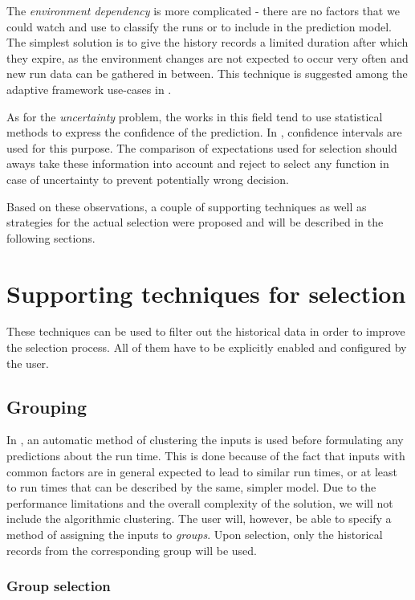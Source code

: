 The \textit{environment dependency} is more complicated - there are no factors that we could watch and use to classify the runs or to include in the prediction model. The simplest solution is to give the history records a limited duration after which they expire, as the environment changes are not expected to occur very often and new run data can be gathered in between. This technique is suggested among the adaptive framework use-cases in \cite{bulej_performance_2012}.

As for the \textit{uncertainty} problem, the works in this field tend to use statistical methods to express the confidence of the prediction. In \cite{smith_predicting_1998}, confidence intervals are used for this purpose. The comparison of expectations used for selection should aways take these information into account and reject to select any function in case of uncertainty to prevent potentially wrong decision.

Based on these observations, a couple of supporting techniques as well as strategies for the actual selection were proposed and will be described in the following sections.

\section{Supporting techniques for selection}

These techniques can be used to filter out the historical data in order to improve the selection process. All of them have to be explicitly enabled and configured by the user.

\subsection{Grouping}
\label{subsec:grouping}

In \cite{smith_predicting_1998}, an automatic method of clustering the inputs is used before formulating any predictions about the run time. This is done because of the fact that inputs with common factors are in general expected to lead to similar run times, or at least to run times that can be described by the same, simpler model. Due to the performance limitations and the overall complexity of the solution, we will not include the algorithmic clustering. The user will, however, be able to specify a method of assigning the inputs to \textit{groups}. Upon selection, only the historical records from the corresponding group will be used.

\subsubsection{Group selection}
\label{subsubsec:group_selection}

